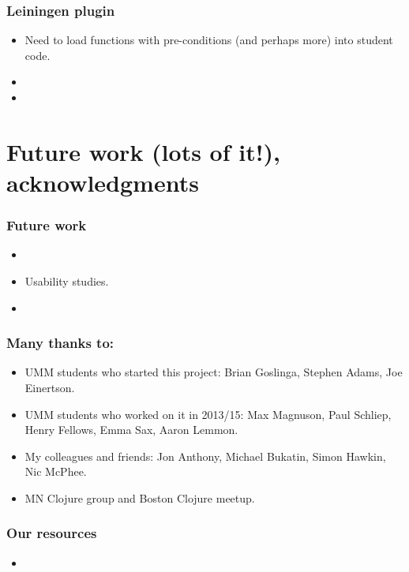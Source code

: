 \documentclass{beamer}
\begin{document}
\begin{frame}
   \frametitle{Leiningen plugin}
\begin{itemize}
\item Need to load functions with pre-conditions (and perhaps more) into student code. 
\item 
\item 
\end{itemize}
\end{frame}

\section{Future work (lots of it!), acknowledgments}

\begin{frame}
   \frametitle{Future work}
\begin{itemize}
\item 
\item Usability studies. 
\item 
\end{itemize}
\end{frame}

\begin{frame}
   \frametitle{Many thanks to:}
\begin{itemize}
\item UMM students who started this project: Brian Goslinga, Stephen Adams, Joe Einertson. 
\item UMM students who worked on it in 2013/15: Max Magnuson, Paul Schliep, Henry Fellows, Emma Sax, Aaron Lemmon. 
\item My colleagues and friends: Jon Anthony, Michael Bukatin, Simon Hawkin, Nic McPhee. 
\item MN Clojure group and Boston Clojure meetup. 
\end{itemize}
\end{frame}

\begin{frame}
   \frametitle{Our resources}
\begin{itemize}
\item 
\end{itemize}
\end{frame}
\end{document}
